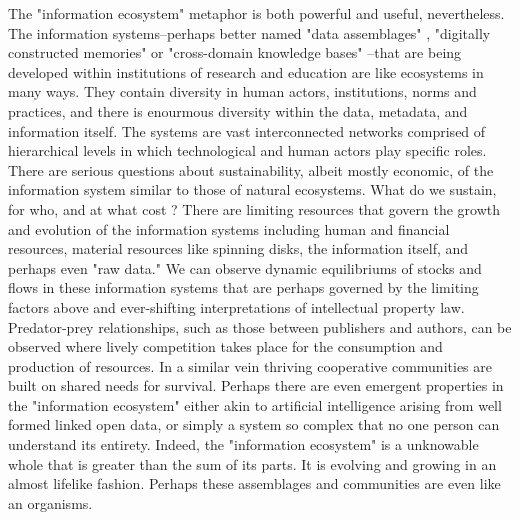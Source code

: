 The "information ecosystem" metaphor is both powerful and useful, nevertheless. The information systems--perhaps better named "data assemblages" \cite{kitchin_2014}, "digitally constructed memories" or "cross-domain knowledge bases" \cite{baker_2007}--that are being developed within institutions of research and education are like ecosystems in many ways. They contain diversity in human actors, institutions, norms and practices, and there is enourmous diversity within the data, metadata, and information itself. The systems are vast interconnected networks comprised of hierarchical levels in which technological and human actors play specific roles. There are serious questions about sustainability, albeit mostly economic, of the information system similar to those of natural ecosystems. What do we sustain, for who, and at what cost \cite[cf.][especially ch. 10)]{liverman_2004, kitchin_2014}? There are limiting resources that govern the growth and evolution of the information systems including human and financial resources, material resources like spinning disks, the information itself, and perhaps even "raw data." We can observe dynamic equilibriums of stocks and flows in these information systems that are perhaps governed by the limiting factors above and ever-shifting interpretations of intellectual property law. Predator-prey relationships, such as those between publishers and authors, can be observed where lively competition takes place for the consumption and production of resources. In a similar vein thriving cooperative communities are built on shared needs for survival. Perhaps there are even emergent properties in the "information ecosystem" either akin to artificial intelligence arising from well formed linked open data, or simply a system so complex that no one person can understand its entirety. Indeed, the "information ecosystem" is a unknowable whole that is greater than the sum of its parts. It is evolving and growing in an almost lifelike fashion. Perhaps these assemblages and communities are even like an organisms.


